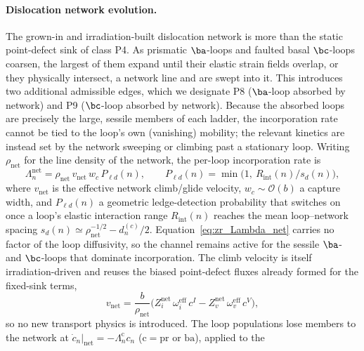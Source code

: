 \paragraph{Dislocation network evolution.}
The grown-in and irradiation-built dislocation network is more than the
static point-defect sink of class P4. As prismatic $\ba$-loops and faulted
basal $\bc$-loops coarsen, the largest of them expand until their elastic
strain fields overlap, or they physically intersect, a network line and
are swept into it. This introduces two additional admissible edges, which
we designate P8 ($\ba$-loop absorbed by network) and P9 ($\bc$-loop
absorbed by network). Because the absorbed loops are precisely the large,
sessile members of each ladder, the incorporation rate cannot be tied to
the loop's own (vanishing) mobility; the relevant kinetics are instead set
by the network sweeping or climbing past a stationary loop. Writing
$\rho_{\mathrm{net}}$ for the line density of the network, the per-loop
incorporation rate is
\begin{equation}
  \Lambda_n^{\mathrm{net}} =
  \rho_{\mathrm{net}}\,v_{\mathrm{net}}\,w_c\,P_{\ell d}(n),
  \qquad
  P_{\ell d}(n) = \min\!\Big(1,\ R_{\mathrm{int}}(n)/s_d(n)\Big),
  \label{eq:zr_Lambda_net}
\end{equation}
where $v_{\mathrm{net}}$ is the effective network climb/glide velocity,
$w_c \sim \mathcal{O}(b)$ a capture width, and $P_{\ell d}(n)$ a geometric
ledge-detection probability that switches on once a loop's elastic
interaction range $R_{\mathrm{int}}(n)$ reaches the mean loop--network
spacing $s_d(n) \simeq \rho_{\mathrm{net}}^{-1/2} - d_n^{(c)}/2$.
Equation~\eqref{eq:zr_Lambda_net} carries no factor of the loop
diffusivity, so the channel remains active for the sessile $\ba$- and
$\bc$-loops that dominate incorporation. The climb velocity is itself
irradiation-driven and reuses the biased point-defect fluxes already
formed for the fixed-sink terms,
\begin{equation}
  v_{\mathrm{net}} = \frac{b}{\rho_{\mathrm{net}}}
  \big(Z_i^{\mathrm{net}}\,\omega_i^{\mathrm{eff}}\,c^{I}
      - Z_v^{\mathrm{net}}\,\omega_v^{\mathrm{eff}}\,c^{V}\big),
  \label{eq:zr_vnet}
\end{equation}
so no new transport physics is introduced. The loop populations lose
members to the network at
$\dot c_n|_{\mathrm{net}} = -\Lambda_n^{\mathrm{c}}c_n$ ($\mathrm{c}=\mathrm{pr}$ or $\mathrm{ba}$), applied to the
